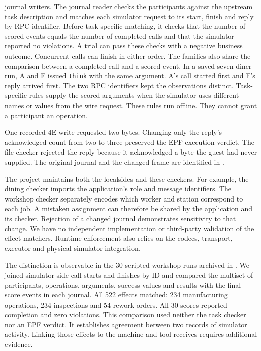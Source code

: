 \documentclass[10pt]{article}
\begin{document}
journal writers.
The journal reader checks the participants against the upstream
task description and matches each simulator request to its start, finish and
reply by RPC identifier. Before task-specific matching, it checks that the
number of scored events equals the number of completed calls and that the
simulator reported no violations. A trial can pass these checks with a
negative business outcome. Concurrent calls can finish in either order. The
families also share the comparison between a completed call and a scored
event. In a saved seven-diner run, A and F issued \texttt{think} with
the same argument. A's call started first and F's reply arrived first.
The two RPC identifiers kept the observations distinct.
Task-specific rules supply the scored arguments when the
simulator uses different names or values from the wire request.
These rules run offline. They cannot grant a participant an operation.

One recorded 4E write requested two bytes. Changing only the reply's
acknowledged count from two to three preserved the EPF execution verdict.
The file checker rejected the reply because it acknowledged a byte the guest
had never supplied. The original journal and the changed frame are identified
in .

The project maintains both the localsides and these checkers. For example,
the dining checker imports the application's role and message identifiers.
The workshop checker separately encodes which worker and station correspond
to each job. A mistaken assignment can therefore be shared by the application
and its checker. Rejection of a changed journal demonstrates sensitivity to
that change. We have no independent implementation or third-party validation
of the effect matchers. Runtime enforcement also relies on the codecs,
transport, executor and physical simulator integration.

The distinction is observable in the 30 scripted workshop runs archived in
. We joined simulator-side call
starts and finishes by ID and compared the multiset of participants,
operations, arguments, success values and results with the final score events
in each journal. All 522 effects matched: 234 manufacturing operations, 234
inspections and 54 rework orders. All 30 scores reported completion and zero
violations. This comparison used neither the task checker nor an EPF verdict.
It establishes agreement between two records of simulator activity. Linking
those effects to the machine and tool receives requires additional evidence.
\end{document}
